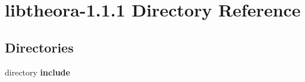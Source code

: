 \section{libtheora-\/1.1.1 Directory Reference}
\label{dir_7b3bd63d69cbc3c1d3117d994bf2c129}
\subsection*{Directories}
\begin{DoxyCompactItemize}
\item 
directory {\bf include}
\end{DoxyCompactItemize}
